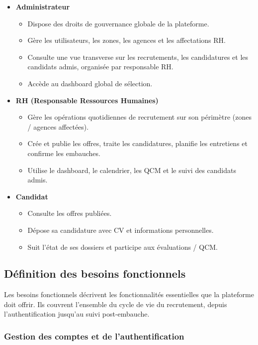 \begin{itemize}
  \item \textbf{Administrateur}
  \begin{itemize}
    \item Dispose des droits de gouvernance globale de la plateforme.
    \item Gère les utilisateurs, les zones, les agences et les affectations RH.
    \item Consulte une vue transverse sur les recrutements, les candidatures
          et les candidats admis, organisée par responsable RH.
    \item Accède au dashboard global de sélection.
  \end{itemize}

  \item \textbf{RH (Responsable Ressources Humaines)}
  \begin{itemize}
    \item Gère les opérations quotidiennes de recrutement sur son périmètre
          (zones / agences affectées).
    \item Crée et publie les offres, traite les candidatures, planifie les
          entretiens et confirme les embauches.
    \item Utilise le dashboard, le calendrier, les QCM et le suivi des
          candidats admis.
  \end{itemize}

  \item \textbf{Candidat}
  \begin{itemize}
    \item Consulte les offres publiées.
    \item Dépose sa candidature avec CV et informations personnelles.
    \item Suit l'état de ses dossiers et participe aux évaluations / QCM.
  \end{itemize}
\end{itemize}


\subsection{Définition des besoins fonctionnels}

Les besoins fonctionnels décrivent les fonctionnalités essentielles que la
plateforme doit offrir. Ils couvrent l'ensemble du cycle de vie du recrutement,
depuis l'authentification jusqu'au suivi post-embauche.


\subsubsection{Gestion des comptes et de l'authentification}

